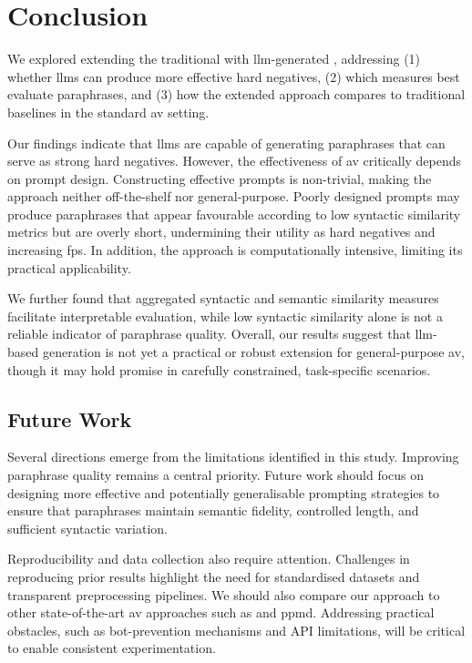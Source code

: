 \chapter{Conclusion}
\label{chap:conclusion}

We explored extending the traditional \impAppr{} with \ac{llm}-generated \imps{}, addressing (1) whether \acp{llm} can produce more effective hard negatives, (2) which measures best evaluate paraphrases, and (3) how the extended approach compares to traditional baselines in the standard \ac{av} setting.

Our findings indicate that \acp{llm} are capable of generating paraphrases that can serve as strong hard negatives. 
However, the effectiveness of \ac{av} critically depends on prompt design. 
Constructing effective prompts is non-trivial, making the approach neither off-the-shelf nor general-purpose. 
Poorly designed prompts may produce paraphrases that appear favourable according to low syntactic similarity metrics but are overly short, undermining their utility as hard negatives and increasing \acp{fp}. 
In addition, the approach is computationally intensive, limiting its practical applicability.  

We further found that aggregated syntactic and semantic similarity measures facilitate interpretable evaluation, while low syntactic similarity alone is not a reliable indicator of paraphrase quality. 
Overall, our results suggest that \ac{llm}-based \imp{} generation is not yet a practical or robust extension for general-purpose \ac{av}, though it may hold promise in carefully constrained, task-specific scenarios.  



\section{Future Work}

Several directions emerge from the limitations identified in this study. 
Improving paraphrase quality remains a central priority. 
Future work should focus on designing more effective and potentially generalisable prompting strategies to ensure that paraphrases maintain semantic fidelity, controlled length, and sufficient syntactic variation.  

Reproducibility and data collection also require attention. 
Challenges in reproducing prior results highlight the need for standardised datasets and transparent preprocessing pipelines. 
We should also compare our approach to other state-of-the-art \ac{av} approaches such as \unmasking{} and \ac{ppmd}.
Addressing practical obstacles, such as bot-prevention mechanisms and API limitations, will be critical to enable consistent experimentation.  

